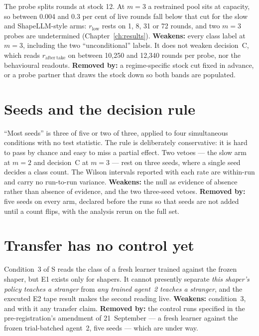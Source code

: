 The probe splits rounds at stock 12.
At \(m=3\) a restrained pool sits at capacity, so between 0.004 and 0.3 per
cent of live rounds fall below that cut for the slow and ShapeLLM-style
arms: \(r_{\mathrm{low}}\) rests on 1, 8, 31 or 72 rounds, and two \(m=3\)
probes are undetermined (Chapter~\ref{ch:results}).
\textbf{Weakens:} every class label at \(m=3\), including the two
``unconditional'' labels.
It does not weaken decision~C, which reads \(r_{\mathrm{after\ take}}\) on
between 10{,}250 and 12{,}340 rounds per probe, nor the behavioural
readouts.
\textbf{Removed by:} a regime-specific stock cut fixed in advance, or a
probe partner that draws the stock down so both bands are populated.

\section{Seeds and the decision rule}
\label{sec:lim-seeds}

``Most seeds'' is three of five or two of three, applied to four
simultaneous conditions with no test statistic.
The rule is deliberately conservative: it is hard to pass by chance and easy
to miss a partial effect.
Two vetoes --- the slow arm at \(m=2\) and decision~C at \(m=3\) --- rest on
three seeds, where a single seed decides a class count.
The Wilson intervals reported with each rate are within-run and carry no
run-to-run variance.
\textbf{Weakens:} the null as evidence of absence rather than absence of
evidence, and the two three-seed vetoes.
\textbf{Removed by:} five seeds on every arm, declared before the runs so
that seeds are not added until a count flips, with the analysis rerun on the
full set.

\section{Transfer has no control yet}
\label{sec:lim-e1}

Condition~3 of S reads the class of a fresh learner trained against the
frozen shaper, but E1 exists only for shapers.
It cannot presently separate \emph{this shaper's policy teaches a stranger}
from \emph{any trained agent~2 teaches a stranger}, and the executed E2 tape
result makes the second reading live.
\textbf{Weakens:} condition~3, and with it any transfer claim.
\textbf{Removed by:} the control runs specified in the pre-registration's
amendment of 21~September --- a fresh learner against the frozen
trial-batched agent~2, five seeds --- which are under way.


